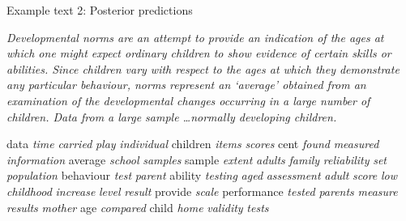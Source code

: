 \begin{frame}{Example text 2: Posterior predictions}

	{\small\textit{
    Developmental norms are an attempt to provide an indication of the ages at which
one might expect ordinary children to show evidence of certain skills or
abilities. Since children vary with respect to the ages at which they
demonstrate any particular behaviour, norms represent an ‘average’ obtained
from an examination of the developmental changes occurring in a large number of
children. Data from a large sample \ldots normally developing children.}
    }
    \begin{center}
    {\fontsize{4.65}{35}\selectfont data}
{\fontsize{11.90}{35}\selectfont \textit{time}}
{\fontsize{4.87}{35}\selectfont \textit{carried}}
{\fontsize{6.02}{35}\selectfont \textit{play}}
{\fontsize{4.64}{35}\selectfont \textit{individual}}
{\fontsize{34.93}{35}\selectfont children}
{\fontsize{7.95}{35}\selectfont \textit{items}}
{\fontsize{14.30}{35}\selectfont \textit{scores}}
{\fontsize{22.39}{35}\selectfont cent}
{\fontsize{9.32}{35}\selectfont \textit{found}}
{\fontsize{4.83}{35}\selectfont \textit{measured}}
{\fontsize{6.39}{35}\selectfont \textit{information}}
{\fontsize{4.61}{35}\selectfont average}
{\fontsize{9.98}{35}\selectfont \textit{school}}
{\fontsize{4.52}{35}\selectfont \textit{samples}}
{\fontsize{11.76}{35}\selectfont sample}
{\fontsize{5.94}{35}\selectfont \textit{extent}}
{\fontsize{14.06}{35}\selectfont \textit{adults}}
{\fontsize{8.25}{35}\selectfont \textit{family}}
{\fontsize{4.49}{35}\selectfont \textit{reliability}}
{\fontsize{6.15}{35}\selectfont \textit{set}}
{\fontsize{7.32}{35}\selectfont \textit{population}}
{\fontsize{5.97}{35}\selectfont behaviour}
{\fontsize{32.47}{35}\selectfont \textit{test}}
{\fontsize{8.77}{35}\selectfont \textit{parent}}
{\fontsize{11.21}{35}\selectfont ability}
{\fontsize{22.31}{35}\selectfont \textit{testing}}
{\fontsize{6.09}{35}\selectfont \textit{aged}}
{\fontsize{8.50}{35}\selectfont \textit{assessment}}
{\fontsize{13.70}{35}\selectfont \textit{adult}}
{\fontsize{12.39}{35}\selectfont \textit{score}}
{\fontsize{5.75}{35}\selectfont \textit{low}}
{\fontsize{7.96}{35}\selectfont \textit{childhood}}
{\fontsize{4.16}{35}\selectfont \textit{increase}}
{\fontsize{4.75}{35}\selectfont \textit{level}}
{\fontsize{5.18}{35}\selectfont \textit{result}}
{\fontsize{7.88}{35}\selectfont provide}
{\fontsize{5.20}{35}\selectfont \textit{scale}}
{\fontsize{9.62}{35}\selectfont performance}
{\fontsize{15.81}{35}\selectfont \textit{tested}}
{\fontsize{20.77}{35}\selectfont \textit{parents}}
{\fontsize{10.22}{35}\selectfont \textit{measure}}
{\fontsize{17.92}{35}\selectfont \textit{results}}
{\fontsize{7.86}{35}\selectfont \textit{mother}}
{\fontsize{16.96}{35}\selectfont age}
{\fontsize{4.77}{35}\selectfont \textit{compared}}
{\fontsize{28.77}{35}\selectfont child}
{\fontsize{5.57}{35}\selectfont \textit{home}}
{\fontsize{9.11}{35}\selectfont \textit{validity}}
{\fontsize{29.15}{35}\selectfont \textit{tests}}
    \end{center}
\end{frame}

